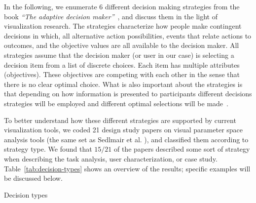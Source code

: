 In the following, we enumerate 6 different decision making strategies from the book \emph{``The adaptive decision
maker''}~\citep{Payne:1993}, and discuss them in the light of visualization research.
The strategies characterize how people make contingent decisions in which, all alternative
action possibilities, events that relate actions to outcomes, and the objective
values are all available to the decision maker.
All strategies assume that the decision maker (or user in our case)
is selecting a decision item from a list of discrete choices. Each item
has multiple attributes (objectives). These objectives are competing with
each other in the sense that there is no clear optimal choice. What is also
important about the strategies is that depending on how information is 
presented to participants different decisions strategies will be employed
and different optimal selections will be made~\citep{Jarvenpaa:1990}.


To better understand how these different strategies are supported by current visualization tools,
we coded 21 design study papers on visual parameter space analysis tools
(the same set as Sedlmair et al. \citep{Sedlmair:2014}), and classified them according to strategy 
type. We found that $15/21$ of the papers described
some sort of strategy when describing the task analysis, user
characterization, or case study. Table~\ref{tab:decision-types} shows an overview of the results;
specific examples will be discussed below.

\begin{table*}[tb]
  \begin{center}
    \caption{Decision types}
  \end{center}
  \label{tab:decision-types}
\end{table*}

